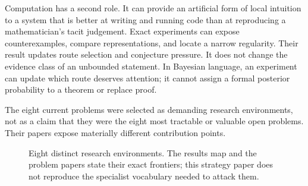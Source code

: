 \documentclass[10pt]{article}
\begin{document}
Computation has a second role.  It can provide an artificial form of local
intuition to a system that is better at writing and running code than at
reproducing a mathematician's tacit judgement.  Exact experiments can expose
counterexamples, compare representations, and locate a narrow regularity.
Their result updates route selection and conjecture pressure.  It does not
change the evidence class of an unbounded statement.  In Bayesian language,
an experiment can update which route deserves attention; it cannot assign a
formal posterior probability to a theorem or replace proof.

The eight current problems were selected as demanding research environments,
not as a claim that they were the eight most tractable or valuable open
problems.  Their papers expose materially different contribution points.

\begin{figure}[H]
\centering
{}
\caption{Eight distinct research environments.  The results map and the
problem papers state their exact frontiers; this strategy paper does not
reproduce the specialist vocabulary needed to attack them.}
\label{fig:problem-worlds}
\end{figure}
\end{document}
